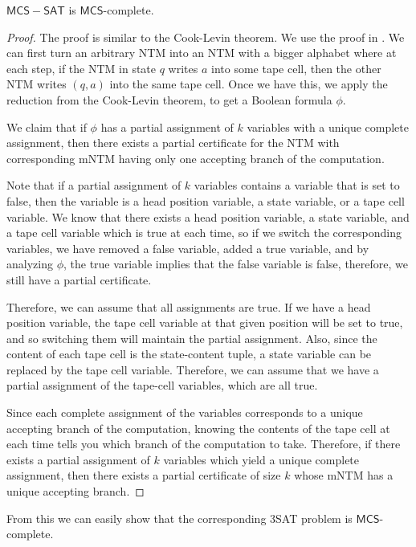 \documentclass[runningheads,a4paper]{llncs}
\begin{document}
\begin{theorem}
$\mathsf{MCS-SAT}$ is $\mathsf{MCS}$-complete.
\end{theorem}

\begin{proof}
The proof is similar to the Cook-Levin theorem. We use the proof in \cite{Garey}. We can first turn an arbitrary NTM into an NTM with a bigger alphabet where at each step, if the NTM in state $q$ writes $a$ into some tape cell, then the other NTM writes $(q,a)$ into the same tape cell. Once we have this, we apply the reduction from the Cook-Levin theorem, to get a Boolean formula $\phi$. 

We claim that if $\phi$ has a partial assignment of $k$ variables with a unique complete assignment, then there exists a partial certificate for the NTM with corresponding mNTM having only one accepting branch of the computation.

Note that if a partial assignment of $k$ variables contains a variable that is set to false, then the variable is a head position variable, a state variable, or a tape cell variable. We know that there exists a head position variable, a state variable, and a tape cell variable which is true at each time, so if we switch the corresponding variables, we have removed a false variable, added a true variable, and by analyzing $\phi$, the true variable implies that the false variable is false, therefore, we still have a partial certificate. 

Therefore, we can assume that all assignments are true. If we have a head position variable, the tape cell variable at that given position will be set to true, and so switching them will maintain the partial assignment. Also, since the content of each tape cell is the state-content tuple, a state variable can be replaced by the tape cell variable. Therefore, we can assume that we have a partial assignment of the tape-cell variables, which are all true. 

Since each complete assignment of the variables corresponds to a unique accepting branch of the computation, knowing the contents of the tape cell at each time tells you which branch of the computation to take. Therefore, if there exists a partial assignment of $k$ variables which yield a unique complete assignment, then there exists a partial certificate of size $k$ whose mNTM has a unique accepting branch.
\end{proof}

From this we can easily show that the corresponding 3SAT problem is $\mathsf{MCS}$-complete.
\end{document}
